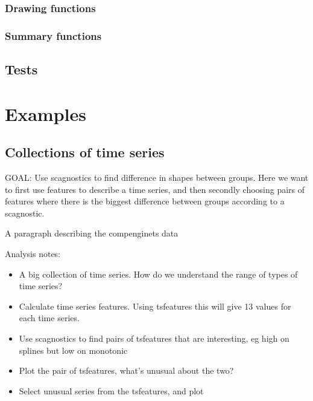 \hypertarget{drawing-functions}{%
\subsubsection{Drawing functions}\label{drawing-functions}}

\hypertarget{summary-functions}{%
\subsubsection{Summary functions}\label{summary-functions}}

\hypertarget{tests}{%
\subsection{Tests}\label{tests}}

\hypertarget{examples}{%
\section{Examples}\label{examples}}

\hypertarget{collections-of-time-series}{%
\subsection{Collections of time
series}\label{collections-of-time-series}}

GOAL: Use scagnostics to find difference in shapes between groups. Here
we want to first use features to describe a time series, and then
secondly choosing pairs of features where there is the biggest
difference between groups according to a scagnostic.

A paragraph describing the compenginets data

Analysis notes:

\begin{itemize}
\tightlist
\item
  A big collection of time series. How do we understand the range of
  types of time series?
\item
  Calculate time series features. Using tsfeatures this will give 13
  values for each time series.
\item
  Use scagnostics to find pairs of tsfeatures that are interesting, eg
  high on splines but low on monotonic
\item
  Plot the pair of tsfeatures, what's unusual about the two?
\item
  Select unusual series from the tsfeatures, and plot
\end{itemize}

